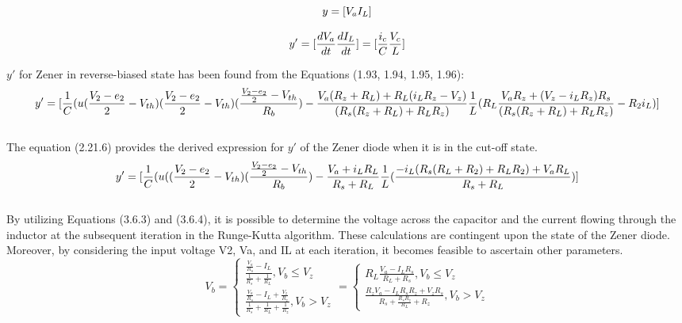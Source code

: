 \begin{equation}
    y=[V_a\\
    I_L]
\end{equation}

\begin{equation}
    y'=[\frac{dV_a}{dt}\\
    \frac{dI_L}{dt}]=[\frac{i_c}{C}\\
    \frac{V_c}{L}]\\
\end{equation}


$y'$ for Zener in reverse-biased state has been found from the Equations (1.93, 1.94, 1.95, 1.96):\\

\begin{equation}
    y'=[\frac{1}{C}(u(\frac{V_2-e_2}{2}-V_{th})(\frac{V_2-e_2}{2}-V_{th})(\frac{\frac{V_2-e_2}{2}-V_{th}}{R_b})-\frac{V_a(R_z+R_L)+R_L(i_LR_z-V_z)}{(R_s(R_z+R_L)+R_LR_z)}\\
    \frac{1}{L}(R_L\frac{V_aR_z+(V_z-i_LR_z)R_s}{(R_s(R_z+R_L)+R_LR_z)}-R_2i_L)]
\end{equation}\\

The equation (2.21.6) provides the derived expression for $y'$ of the Zener diode when it is in the cut-off state.\\

\begin{equation}
    y'=[\frac{1}{C}(u((\frac{V_2-e_2}{2}-V_{th})(\frac{\frac{V_2-e_2}{2}-V_{th}}{R_b})-\frac{V_a+i_LR_L}{R_s+R_L}\\
    \frac{1}{L}(\frac{-i_L(R_s(R_L+R_2)+R_LR_2)+V_aR_L}{R_s+R_L})]
\end{equation}\\

By utilizing Equations (3.6.3) and (3.6.4), it is possible to determine the voltage across the capacitor and the current flowing through the inductor at the subsequent iteration in the Runge-Kutta algorithm. These calculations are contingent upon the state of the Zener diode. Moreover, by considering the input voltage V2, Va, and IL at each iteration, it becomes feasible to ascertain other parameters.\\

\begin{equation}
    V_b=\begin{cases}
        \frac{\frac{V_a}{R_s}-I_L}{\frac{1}{R_s}+\frac{1}{R_L}}, V_b \leq V_z\\
        \frac{\frac{V_a}{R_s}-I_L+\frac{V_z}{R_z}}{\frac{1}{R_s}+\frac{1}{R_L}+\frac{1}{R_z}}, V_b>V_z
    \end{cases}=\begin{cases}
        R_L\frac{V_a-I_LR_s}{R_L+R_s}, V_b \leq V_z\\
        \frac{R_zV_a-I_LR_sR_z+V_zR_s}{R_s+\frac{R_sR_z}{R_L}+R_z}, V_b>V_z
    \end{cases}
\end{equation}\\

